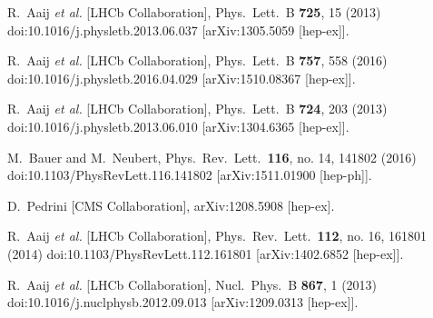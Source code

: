 \documentclass{PoS}
\begin{document}
\begin{thebibliography}{99}
  R.~Aaij {\it et al.} [LHCb Collaboration],
  Phys.\ Lett.\ B {\bf 725}, 15 (2013)
  doi:10.1016/j.physletb.2013.06.037
  [arXiv:1305.5059 [hep-ex]].


  R.~Aaij {\it et al.} [LHCb Collaboration],
  Phys.\ Lett.\ B {\bf 757}, 558 (2016)
  doi:10.1016/j.physletb.2016.04.029
  [arXiv:1510.08367 [hep-ex]].


  R.~Aaij {\it et al.} [LHCb Collaboration],
  Phys.\ Lett.\ B {\bf 724}, 203 (2013)
  doi:10.1016/j.physletb.2013.06.010
  [arXiv:1304.6365 [hep-ex]].
 
  M.~Bauer and M.~Neubert,
  Phys.\ Rev.\ Lett.\  {\bf 116}, no. 14, 141802 (2016)
  doi:10.1103/PhysRevLett.116.141802
  [arXiv:1511.01900 [hep-ph]].

 

  D.~Pedrini [CMS Collaboration],
  arXiv:1208.5908 [hep-ex].


  R.~Aaij {\it et al.} [LHCb Collaboration],
  Phys.\ Rev.\ Lett.\  {\bf 112}, no. 16, 161801 (2014)
  doi:10.1103/PhysRevLett.112.161801
  [arXiv:1402.6852 [hep-ex]].


  R.~Aaij {\it et al.} [LHCb Collaboration],
  Nucl.\ Phys.\ B {\bf 867}, 1 (2013)
  doi:10.1016/j.nuclphysb.2012.09.013
  [arXiv:1209.0313 [hep-ex]].
  
  
  
\end{thebibliography}
\end{document}
